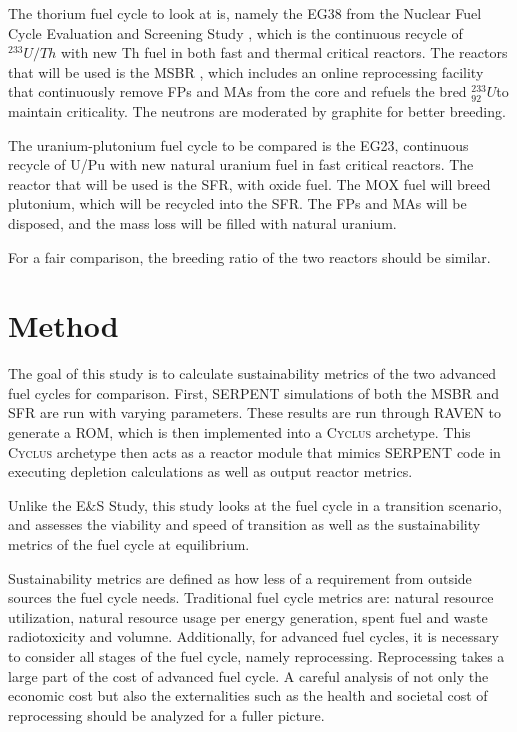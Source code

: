 \documentclass{article}
\newcommand{\Cyclus}{\textsc{Cyclus}\xspace}%
\newcommand{\uthree}{$^{233}_{92}U$}
\begin{document}
The thorium fuel cycle to look at is, namely the EG38
from the Nuclear Fuel Cycle Evaluation and Screening Study \cite{wigeland_nuclear_2014},
which is the continuous recycle of $^{233}U/Th$ with new
Th fuel in both fast and thermal critical reactors.
The reactors that will be used is the \gls{MSBR} \cite{robertson_conceptual_1971},
which includes an online reprocessing facility that
continuously remove \glspl{FP} and \glspl{MA} from the core
and refuels the bred \uthree to maintain criticality. 
The neutrons are moderated by graphite for better breeding.


The uranium-plutonium fuel cycle to be compared is the 
EG23, continuous recycle of U/Pu with new natural uranium
fuel in fast critical reactors. The reactor that will be used
is the \gls{SFR}, with oxide fuel. The \gls{MOX} fuel will 
breed plutonium, which will be recycled into the \gls{SFR}.
The \glspl{FP} and \glspl{MA} will be disposed, and the 
mass loss will be filled with natural uranium.

For a fair comparison, the breeding ratio of the two
reactors should be similar.

\section{Method}

The goal of this study is to calculate sustainability
metrics of the two advanced fuel cycles for comparison.
First, SERPENT simulations of both the \gls{MSBR} and \gls{SFR}
are run with varying parameters. These results are run
through RAVEN \cite{rabiti_mathematical_2013} to generate
a \gls{ROM}, which is then implemented into a \Cyclus
archetype. This \Cyclus archetype then acts as a reactor
module that mimics SERPENT code in executing depletion
calculations as well as output reactor metrics.

Unlike the E\&S Study, this study looks at the 
fuel cycle in a transition scenario, and assesses
the viability and speed of transition as well as
the sustainability metrics of the fuel cycle at equilibrium.

Sustainability metrics are defined as how less of a requirement
from outside sources the fuel cycle needs. Traditional fuel cycle
metrics are: natural resource utilization, natural resource
usage per energy generation, spent fuel and waste radiotoxicity
and volumne.  Additionally, for advanced fuel cycles,
it is necessary to consider all stages of the fuel cycle,
namely reprocessing. Reprocessing takes a large part of the 
cost of advanced fuel cycle. A careful analysis of not only
the economic cost but also the externalities such as the health and societal cost of 
reprocessing should be analyzed for a fuller picture.
\end{document}
